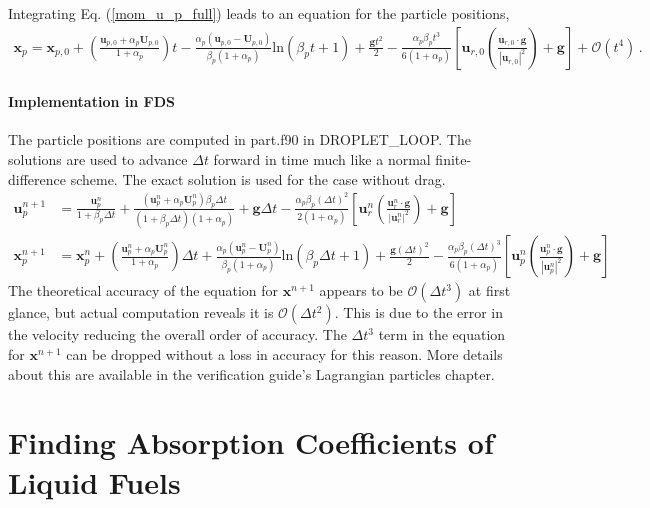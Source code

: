 Integrating Eq. (\ref{mom_u_p_full}) leads to an equation for the particle positions,
\begin{align}
    \label{mom_x_p_full}
    \mathbf{x}_p = \mathbf{x}_{p,0} + \left(\frac{\mathbf{u}_{p,0} + \alpha_p \mathbf{U}_{p,0}}{1 + \alpha_p}\right) t - \frac{\alpha_p (\mathbf{u}_{p,0} - \mathbf{U}_{p,0})}{\beta_p (1 + \alpha_p)} \text{ln}(\beta_p t + 1) + \frac{\mathbf{g} t^2}{2} - \frac{\alpha_p \beta_p t^3}{6 (1 + \alpha_p)} \left[\mathbf{u}_{r,0} \left(\frac{\mathbf{u}_{r,0} \cdot \mathbf{g}}{|\mathbf{u}_{r,0}|^2}\right) + \mathbf{g}\right] + \mathcal{O}(t^4) \,.
\end{align}
\subsubsection{Implementation in FDS}
The particle positions are computed in {\ct part.f90} in {\ct DROPLET\_LOOP}. The solutions are used to advance $\Delta t$ forward in time much like a normal finite-difference scheme. The exact solution is used for the case without drag.
\begin{align}
    \mathbf{u}_p^{n+1} &= \frac{\mathbf{u}_p^n}{1 + \beta_p \Delta t} + \frac{(\mathbf{u}_p^n + \alpha_p \mathbf{U}_p^n)\beta_p \Delta t}{(1 + \beta_p \Delta t)(1 + \alpha_p)} + \mathbf{g} \Delta t - \frac{\alpha_p \beta_p (\Delta t)^2}{2 (1 + \alpha_p)} \left[\mathbf{u}_r^n \left(\frac{\mathbf{u}_r^n \cdot \mathbf{g}}{|\mathbf{u}_r^n|^2}\right) + \mathbf{g}\right] \\[1cm]
    \mathbf{x}_p^{n+1} &= \mathbf{x}_p^n + \left(\frac{\mathbf{u}_p^n + \alpha_p \mathbf{U}_p^n}{1 + \alpha_p}\right) \Delta t + \frac{\alpha_p (\mathbf{u}_p^n - \mathbf{U}_p^n)}{\beta_p (1 + \alpha_p)} \text{ln}(\beta_p \Delta t + 1) + \frac{\mathbf{g} (\Delta t)^2}{2} - \frac{\alpha_p \beta_p (\Delta t)^3}{6 (1 + \alpha_p)} \left[\mathbf{u}_p^n \left(\frac{\mathbf{u}_p^n \cdot \mathbf{g}}{|\mathbf{u}_p^n|^2}\right) + \mathbf{g}\right]
\end{align}
The theoretical accuracy of the equation for $\mathbf{x}^{n+1}$ appears to be $\mathcal{O}(\Delta t^3)$ at first glance, but actual computation reveals it is $\mathcal{O}(\Delta t^2)$. This is due to the error in the velocity reducing the overall order of accuracy. The $\Delta t^3$ term in the equation for $\mathbf{x}^{n+1}$ can be dropped without a loss in accuracy for this reason. More details about this are available in the verification guide's Lagrangian particles chapter.

\chapter{Finding Absorption Coefficients of Liquid Fuels}
\label{app_abscoeff}

